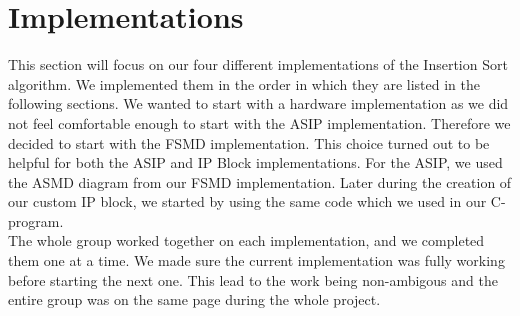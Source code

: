 \documentclass[conference]{IEEEtran}
\begin{document}
\section{Implementations}
This section will focus on our four different implementations of the Insertion Sort algorithm. We implemented them in the order in which they are listed in the following sections. We wanted to start with a hardware implementation as we did not feel comfortable enough to start with the ASIP implementation. Therefore we decided to start with the FSMD implementation. This choice turned out to be helpful for both the ASIP and IP Block implementations. For the ASIP, we used the ASMD diagram from our FSMD implementation. Later during the creation of our custom IP block, we started by using the same code which we used in our C-program. \\
The whole group worked together on each implementation, and we completed them one at a time. We made sure the current implementation was fully working before starting the next one. This lead to the work being non-ambigous and the entire group was on the same page during the whole project.
\end{document}
